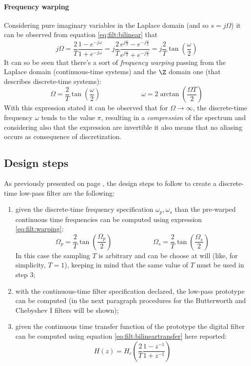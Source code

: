 	\paragraph{Frequency warping} Considering pure imaginary variables in the Laplace domain (and so $s=j\Omega$) it can be observed from equation \ref{eq:filt:bilinear} that
	\[ j\Omega = \frac 2T \frac {1 - e^{-j\omega}}{1+ e^{-j\omega}} = j \frac 2 T \frac{e^{j\frac \omega 2} - e^{-j \frac \omega 2}}{e^{j\frac \omega 2 } + e^{-j\frac \omega 2 } } = j \frac 2  T \tan\left(\frac \omega 2 \right) \]
	It can so be seen that there's a sort of \textit{frequency warping} passing from the Laplace domain (continuous-time systems) and the $\Z$ domain one (that describes discrete-time systems):
	\begin{equation} \label{eq:filt:warping}
		\Omega  = \frac 2 T \tan\left( \frac \omega 2 \right) \qquad \qquad \qquad \omega = 2 \arctan\left(\frac{\Omega T}{2}\right)
	\end{equation}
	With this expression stated it can be observed that for $\Omega\rightarrow \infty$, the discrete-time frequency $\omega$ tends to the value $\pi$, resulting in a \textit{compression} of the spectrum and considering also that the expression are invertible it also means that no aliasing occurs as consequence of discretization.
	
\subsection*{Design steps}
	As previously presented on page \pageref{sec:filt:IIR}, the design steps to follow to create a discrete-time low-pass filter are the following:
	\begin{enumerate}
		\item given the discrete-time frequency specification $\omega_p,\omega_s$ than the pre-warped continuous time frequencies can be computed using expression \ref{eq:filt:warping}:
		\[ \Omega_p = \frac  2 T \tan\left(\frac{\Omega_p}{2}\right) \qquad \qquad \qquad \Omega_s = \frac  2 T \tan\left(\frac{\Omega_s}{2}\right)  \]
		In this case the sampling $T$ is arbitrary and can be choose at will (like, for simplicity, $T=1$), keeping in mind that the same value of $T$ must be used in step 3;
		
		\item with the continuous-time filter specification declared, the low-pass prototype can be computed (in the next paragraph procedures for the Butterworth and Chebyshev I filters will be shown);
		
		\item given the continuous time transfer function of the prototype the digital filter can be computed using equation \ref{eq:filt:bilineartransfer} here reported:
		\[ H(z) = H_c\left(\frac 2 T \frac{1 - z^{-1}}{1 + z^{-1} }\right) \]
		
	\end{enumerate}
	
	
	
	
	
	
	
	
	
	
	
	
	
	
	
	
	
	
	
	
	
	
	
	
	
	
	